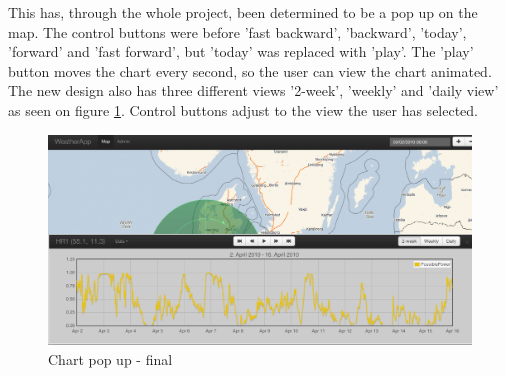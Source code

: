 This has, through the whole project, been determined to be a pop up on the map.
The control buttons were before 'fast backward', 'backward', 'today', 'forward' and 'fast forward', but 'today' was replaced with 'play'. The 'play' button moves the chart every second, so the user can view the chart animated.\\
The new design also has three different views '2-week', 'weekly' and 'daily view' as seen on figure \ref{fig:chart_final}. Control buttons adjust to the view the user has selected.

\begin{figure}[htbp]
   \centering
   \includegraphics[width=1\linewidth]{figure/design_chart_final.eps}
   \caption{Chart pop up - final}
   \label{fig:chart_final}
\end{figure}



